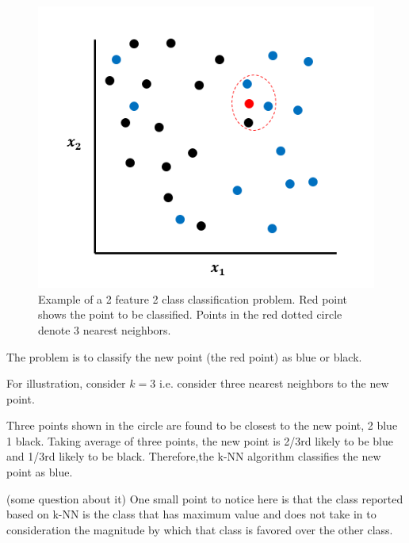 \documentclass{article}
\begin{document}
{{        \begin{figure}
            \label{Fig.1}
            \begin{center}
                \includegraphics[scale=0.5]{classificationkNN.PNG}
                \caption{Example of a 2 feature 2 class classification problem. Red point shows the point to be classified. Points in the red dotted circle denote 3 nearest neighbors.}
            \end{center} 
        \end{figure}

        The problem is to classify the new point (the red point) as blue or black. 

        For illustration, consider $k = 3$ i.e. consider three nearest neighbors to the new point. 

        Three points shown in the circle are found to be closest to the new point, 2 blue 1 black. Taking average of three points, the new point is 2/3rd likely to be blue and 1/3rd likely to be black. Therefore,the k-NN algorithm classifies the new point as blue. 

        (some question about it) One small point to notice here is that the class reported based on k-NN is the class that has maximum value and does not take in to consideration the magnitude by which that class is favored over the other class.
    }
}
\end{document}
